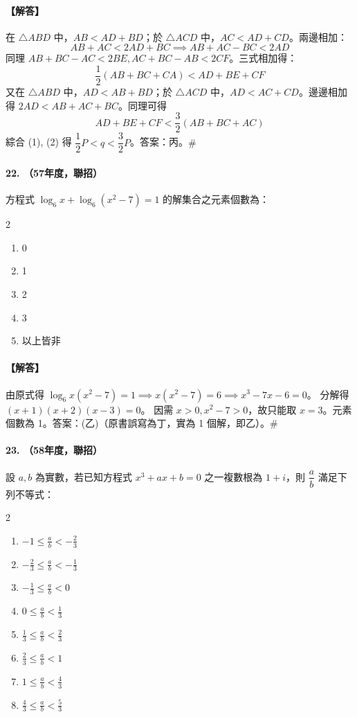 \paragraph{【解答】}
在 $\triangle ABD$ 中，$AB < AD+BD$；於 $\triangle ACD$ 中，$AC < AD+CD$。兩邊相加：
\[ AB+AC < 2AD+BC \implies AB+AC-BC < 2AD \]
同理 $AB+BC-AC < 2BE, AC+BC-AB < 2CF$。三式相加得：
\[ \dfrac{1}{2}(AB+BC+CA) < AD+BE+CF \tag{1} \]
又在 $\triangle ABD$ 中，$AD < AB+BD$；於 $\triangle ACD$ 中，$AD < AC+CD$。邊邊相加得 $2AD < AB+AC+BC$。同理可得
\[ AD+BE+CF < \dfrac{3}{2}(AB+BC+AC) \tag{2} \]
綜合 (1), (2) 得 $\dfrac{1}{2}P < q < \dfrac{3}{2}P$。答案：丙。\hfill$\#$

\paragraph{22. （57年度，聯招）}
方程式 $\log_6 x + \log_6(x^2-7) = 1$ 的解集合之元素個數為：
\begin{multicols}{2}
\begin{enumerate}[label=\tiangan*]
  \item 0
  \item 1
  \item 2
  \item 3
  \item 以上皆非
\end{enumerate}
\end{multicols}

\paragraph{【解答】}
由原式得 $\log_6 x(x^2-7) = 1 \implies x(x^2-7) = 6 \implies x^3-7x-6 = 0$。
分解得 $(x+1)(x+2)(x-3) = 0$。
因需 $x>0, x^2-7>0$，故只能取 $x=3$。元素個數為 1。答案：(乙)（原書誤寫為丁，實為 1 個解，即乙）。\hfill$\#$

\paragraph{23. （58年度，聯招）}
設 $a, b$ 為實數，若已知方程式 $x^3+ax+b=0$ 之一複數根為 $1+i$，則 $\dfrac{a}{b}$ 滿足下列不等式：
\begin{multicols}{2}
\begin{enumerate}[label=\tiangan*]
  \item $-1 \le \frac{a}{b} < -\frac{2}{3}$
  \item $-\frac{2}{3} \le \frac{a}{b} < -\frac{1}{3}$
  \item $-\frac{1}{3} \le \frac{a}{b} < 0$
  \item $0 \le \frac{a}{b} < \frac{1}{3}$
  \item $\frac{1}{3} \le \frac{a}{b} < \frac{2}{3}$
  \item $\frac{2}{3} \le \frac{a}{b} < 1$
  \item $1 \le \frac{a}{b} < \frac{4}{3}$
  \item $\frac{4}{3} \le \frac{a}{b} < \frac{5}{3}$
\end{enumerate}
\end{multicols}

